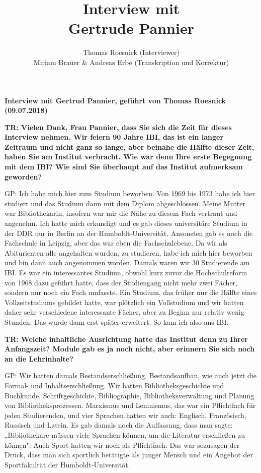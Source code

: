 \documentclass[a4paper,
fontsize=11pt,
oneside,
numbers=noperiodatend,
parskip=half-,
bibliography=totoc,
final
]{scrartcl}
\title{\LARGE{Interview mit \\ Gertrude Pannier}}%
\author{Thomas Roesnick (Interviewer) \\ Miriam Brauer \& Andreas Erbe (Transkription und Korrektur)} %
\date{}
\begin{document}
\maketitle
\thispagestyle{fancyplain} 


\textbf{{Interview mit Gertrud Pannier, geführt von Thomas Roesnick
(09.07.2018)}}

\textbf{TR: Vielen Dank, Frau Pannier, dass Sie sich die Zeit für dieses
Interview nehmen. Wir feiern 90 Jahre IBI, das ist ein langer Zeitraum
und nicht ganz so lange, aber beinahe die Hälfte dieser Zeit, haben Sie
am Institut verbracht. Wie war denn Ihre erste Begegnung mit dem IBI?
Wie sind Sie überhaupt auf das Institut aufmerksam geworden?}

GP: Ich habe mich hier zum Studium beworben. Von 1969 bis 1973 habe ich
hier studiert und das Studium dann mit dem Diplom abgeschlossen. Meine
Mutter war Bibliothekarin, insofern war mir die Nähe zu diesem Fach
vertraut und angenehm. Ich hatte mich erkundigt und es gab dieses
universitäre Studium in der DDR nur in Berlin an der
Humboldt-Universität. Ansonsten gab es noch die Fachschule in Leipzig,
aber das war eben die Fachschulebene. Da wir als Abiturienten alle
angehalten wurden, zu studieren, habe ich mich hier beworben und bin
dann auch angenommen worden. Damals waren wir 30 Studierende am IBI. Es
war ein interessantes Studium, obwohl kurz zuvor die Hochschulreform von
1968 dazu geführt hatte, dass der Studiengang nicht mehr zwei Fächer,
sondern nur noch ein Fach umfasste. Ein Studium, das früher nur die
Hälfte eines Vollzeitstudiums gebildet hatte, war plötzlich ein
Vollstudium und wir hatten daher sehr verschiedene interessante Fächer,
aber zu Beginn nur relativ wenig Stunden. Das wurde dann erst später
erweitert. So kam ich also ans IBI.

\textbf{TR: Welche inhaltliche Ausrichtung hatte das Institut denn zu
Ihrer Anfangszeit? Module gab es ja noch nicht, aber erinnern Sie sich
noch an die Lehrinhalte?}

GP: Wir hatten damals Bestandserschließung, Bestandsaufbau, wie auch
jetzt die Formal- und Inhaltserschließung. Wir hatten
Bibliotheksgeschichte und Buchkunde, Schriftgeschichte, Bibliographie,
Bibliotheksverwaltung und Planung von Bibliotheksprozessen. Marxismus
und Leninismus, das war ein Pflichtfach für jeden Studierenden, und vier
Sprachen hatten wir auch: Englisch, Französisch, Russisch und Latein. Es
gab damals noch die Auffassung, dass man sagte: „Bibliothekare müssen
viele Sprachen können, um die Literatur erschließen zu können". Auch
Sport hatten wir noch als Pflichtfach. Das war sozusagen der Druck, dass
man sich sportlich betätigte als junger Mensch und ein Angebot der
Sportfakultät der Humboldt-Universität.
\end{document}
